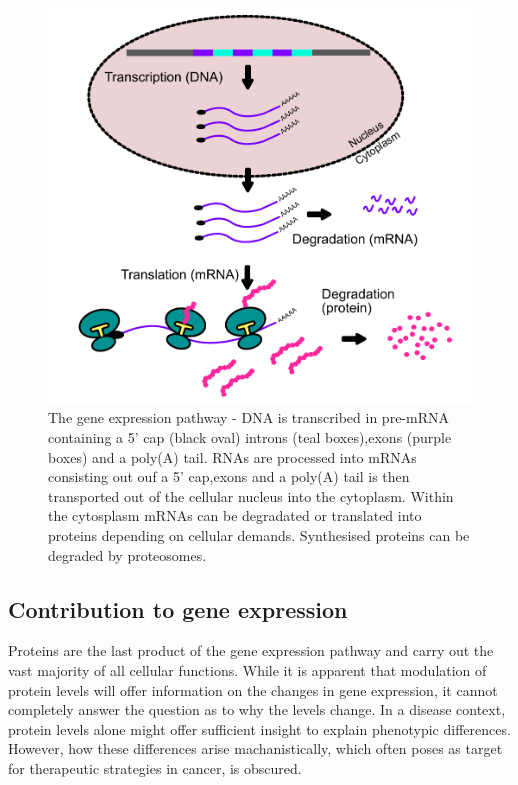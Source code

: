 \documentclass[12pt,openany]{book}
\begin{document}
\begin{figure}
  \includegraphics{./figures/geneExprPath_2.pdf}
  \caption{The gene expression pathway - DNA is transcribed in pre-mRNA containing a 5' cap (black oval) introns (teal boxes),exons (purple boxes) and a poly(A) tail. RNAs are processed into mRNAs consisting out ouf a 5' cap,exons and a poly(A) tail is then transported out of the cellular nucleus into the cytoplasm. Within the cytosplasm mRNAs can be degradated or translated  into proteins depending on cellular demands. Synthesised proteins can be degraded by proteosomes. \label{fig:geneExprPath}}
\end{figure}

\clearpage
\subsection{Contribution to gene expression} Proteins are the last
product of the gene expression pathway and carry out the vast majority
of all cellular functions. While it is apparent that modulation of
protein levels will offer information on the changes in gene expression,
it cannot completely answer the question as to why the levels change. In
a disease context, protein levels alone might offer sufficient insight
to explain phenotypic differences. However, how these differences arise
machanistically, which often poses as target for therapeutic strategies
in cancer, is obscured.
\end{document}
